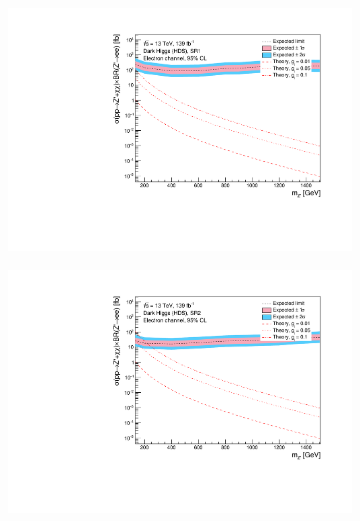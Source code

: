 \documentclass[12pt, a4paper]{book}
\begin{document}
\begin{figure}[!ht]
	\centering
	\begin{subfigure}[b]{0.49\textwidth}
      \centering
      \includegraphics[width=1\textwidth]{Limits/Model_independent/50-100/DH_HDS/mass_exclusion_ee.pdf}
   \end{subfigure}
   \hfill
   \begin{subfigure}[b]{0.49\textwidth}
      \centering
      \includegraphics[width=1\textwidth]{Limits/Model_independent/100-150/DH_HDS/mass_exclusion_ee.pdf}
   \end{subfigure}
   \hfill
	\begin{subfigure}[b]{0.49\textwidth}
      \centering

\end{subfigure}
\end{figure}
\end{document}
